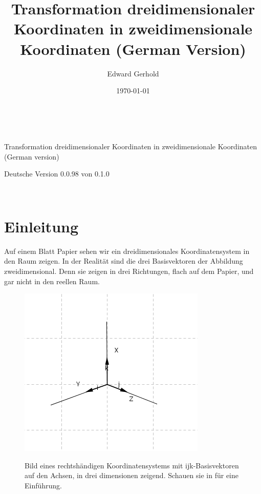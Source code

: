 \documentclass[a4paper]{article}
\begin{document}
\begin{center}
\title{Transformation dreidimensionaler Koordinaten in zweidimensionale Koordinaten (German Version)}\\
\author{Edward Gerhold}
Transformation dreidimensionaler Koordinaten in zweidimensionale Koordinaten (German version)
\date{\today}
\maketitle


Deutsche Version 0.0.98 von 0.1.0\\

\end{center} 

\tableofcontents\\

\section{Einleitung}

Auf einem Blatt Papier sehen wir ein dreidimensionales Koordinatensystem in den Raum zeigen.
In der Realit\"at sind die drei Basisvektoren der Abbildung zweidimensional. Denn sie zeigen 
in drei Richtungen, flach auf dem Papier, und gar nicht in den reellen Raum.\\

\begin{figure}[ht]
\label{ijksystem}
\includegraphics[scale=2]{ijksystem.png}\\
\caption{Bild eines rechtsh\"andigen Koordinatensystems mit ijk-Basisvektoren auf den Achsen, in drei dimensionen zeigend. Schauen sie in \cite{Corral1} f\"ur eine Einf\"uhrung.}
\end{figure}
\end{document}
